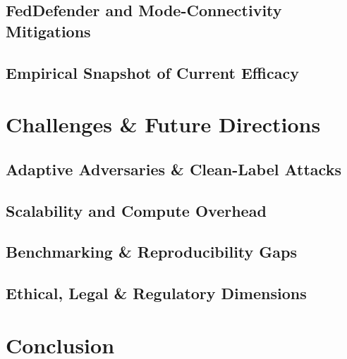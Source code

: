 \documentclass[sigconf,authorversion,nonacm,balance=false]{acmart}
\begin{document}
\subsection{FedDefender and Mode-Connectivity Mitigations}
\subsection{Empirical Snapshot of Current Efficacy}

\section{Challenges \& Future Directions}\label{sec:future}
\subsection{Adaptive Adversaries \& Clean-Label Attacks}
\subsection{Scalability and Compute Overhead}
\subsection{Benchmarking \& Reproducibility Gaps}
\subsection{Ethical, Legal \& Regulatory Dimensions}

\section{Conclusion}\label{sec:conclusion}



\end{document}
